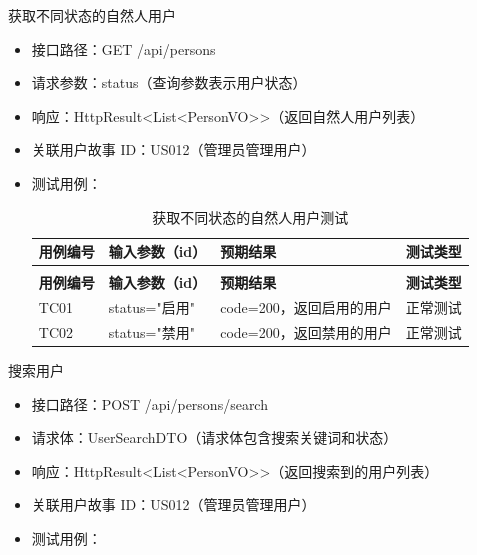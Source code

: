 \begin{levellist}
\begin{levellist}
        \item 获取不同状态的自然人用户
        \begin{itemize}
            \item 接口路径：GET /api/persons
            \item 请求参数：status（查询参数表示用户状态）
            \item 响应：HttpResult<List<PersonVO>>（返回自然人用户列表）
            \item 关联用户故事 ID：US012（管理员管理用户）
            \item 测试用例：
                  \begin{longtable}{>{\centering\arraybackslash}m{1.7cm} >{\centering\arraybackslash}m{4cm} >{\centering\arraybackslash}m{5.3cm} >{\centering\arraybackslash}m{2cm}}

                      \caption{获取不同状态的自然人用户测试} \label{tab:training}                        \\

                      \toprule
                      \textbf{用例编号} & \textbf{输入参数（id）} & \textbf{预期结果}    & \textbf{测试类型} \\
                      \midrule
                      \endfirsthead

                      \multicolumn{4}{c}{{\tablename\ \thetable{} 续表}}                     \\
                      \toprule
                      \textbf{用例编号} & \textbf{输入参数（id）} & \textbf{预期结果}    & \textbf{测试类型} \\
                      \midrule
                      \endhead

                      \bottomrule
                      \endfoot

                      TC01          & status="启用"       & code=200，返回启用的用户 & 正常测试          \\
                      TC02          & status="禁用"       & code=200，返回禁用的用户 & 正常测试          \\
                  \end{longtable}
        \end{itemize}

        \item 搜索用户
        \begin{itemize}
            \item 接口路径：POST /api/persons/search
            \item 请求体：UserSearchDTO（请求体包含搜索关键词和状态）
            \item 响应：HttpResult<List<PersonVO>>（返回搜索到的用户列表）
            \item 关联用户故事 ID：US012（管理员管理用户）
            \item 测试用例：
                  \begin{longtable}{>{\centering\arraybackslash}m{1.7cm} >{\centering\arraybackslash}m{4cm} >{\centering\arraybackslash}m{5.3cm} >{\centering\arraybackslash}m{2cm}}


\end{longtable}
\end{itemize}
\end{levellist}
\end{levellist}
